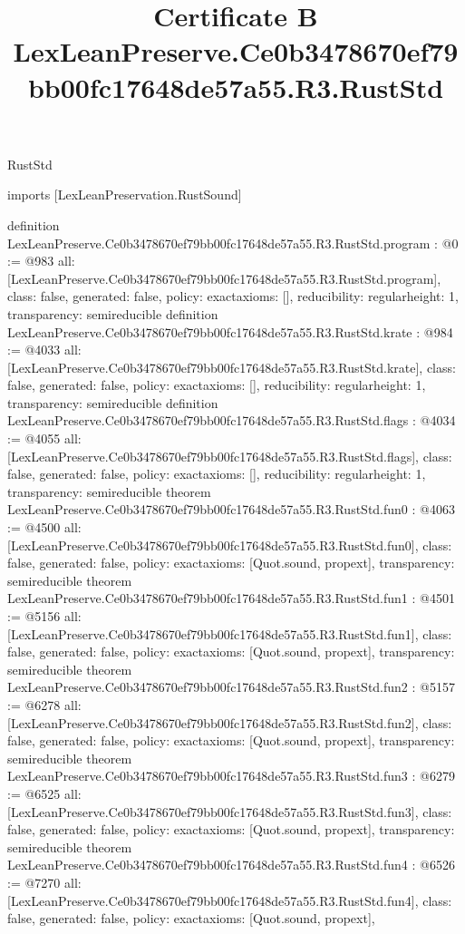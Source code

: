 \begin{lexlean}{RustStd}
\title{Certificate B LexLeanPreserve.Ce0b3478670ef79bb00fc17648de57a55.R3.RustStd}
\begin{coremodule}
imports [LexLeanPreservation.RustSound]

definition LexLeanPreserve.Ce0b3478670ef79bb00fc17648de57a55.R3.RustStd.program : @0 := @983 {
  all: [LexLeanPreserve.Ce0b3478670ef79bb00fc17648de57a55.R3.RustStd.program],
  class: false,
  generated: false,
  policy: exact{axioms: []},
  reducibility: regular{height: 1},
  transparency: semireducible
}
definition LexLeanPreserve.Ce0b3478670ef79bb00fc17648de57a55.R3.RustStd.krate : @984 := @4033 {
  all: [LexLeanPreserve.Ce0b3478670ef79bb00fc17648de57a55.R3.RustStd.krate],
  class: false,
  generated: false,
  policy: exact{axioms: []},
  reducibility: regular{height: 1},
  transparency: semireducible
}
definition LexLeanPreserve.Ce0b3478670ef79bb00fc17648de57a55.R3.RustStd.flags : @4034 := @4055 {
  all: [LexLeanPreserve.Ce0b3478670ef79bb00fc17648de57a55.R3.RustStd.flags],
  class: false,
  generated: false,
  policy: exact{axioms: []},
  reducibility: regular{height: 1},
  transparency: semireducible
}
theorem LexLeanPreserve.Ce0b3478670ef79bb00fc17648de57a55.R3.RustStd.fun0 : @4063 := @4500 {
  all: [LexLeanPreserve.Ce0b3478670ef79bb00fc17648de57a55.R3.RustStd.fun0],
  class: false,
  generated: false,
  policy: exact{axioms: [Quot.sound, propext]},
  transparency: semireducible
}
theorem LexLeanPreserve.Ce0b3478670ef79bb00fc17648de57a55.R3.RustStd.fun1 : @4501 := @5156 {
  all: [LexLeanPreserve.Ce0b3478670ef79bb00fc17648de57a55.R3.RustStd.fun1],
  class: false,
  generated: false,
  policy: exact{axioms: [Quot.sound, propext]},
  transparency: semireducible
}
theorem LexLeanPreserve.Ce0b3478670ef79bb00fc17648de57a55.R3.RustStd.fun2 : @5157 := @6278 {
  all: [LexLeanPreserve.Ce0b3478670ef79bb00fc17648de57a55.R3.RustStd.fun2],
  class: false,
  generated: false,
  policy: exact{axioms: [Quot.sound, propext]},
  transparency: semireducible
}
theorem LexLeanPreserve.Ce0b3478670ef79bb00fc17648de57a55.R3.RustStd.fun3 : @6279 := @6525 {
  all: [LexLeanPreserve.Ce0b3478670ef79bb00fc17648de57a55.R3.RustStd.fun3],
  class: false,
  generated: false,
  policy: exact{axioms: [Quot.sound, propext]},
  transparency: semireducible
}
theorem LexLeanPreserve.Ce0b3478670ef79bb00fc17648de57a55.R3.RustStd.fun4 : @6526 := @7270 {
  all: [LexLeanPreserve.Ce0b3478670ef79bb00fc17648de57a55.R3.RustStd.fun4],
  class: false,
  generated: false,
  policy: exact{axioms: [Quot.sound, propext]},
}
\end{coremodule}
\end{lexlean}
